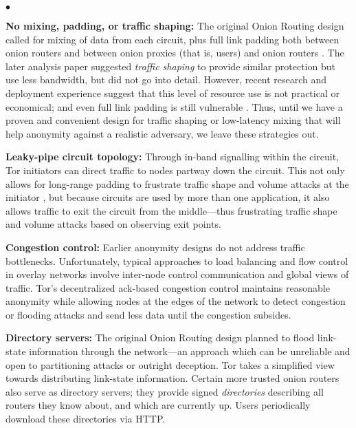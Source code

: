 \documentclass[times,10pt,twocolumn]{article}
\newenvironment{tightlist}{\begin{list}{$\bullet$}{
  \setlength{\itemsep}{0mm}
    \setlength{\parsep}{0mm}
    }}{\end{list}}
\begin{document}
\begin{tightlist}
\item \textbf{No mixing, padding, or traffic shaping:} The original
Onion Routing design called for mixing of data from each circuit,
plus full link padding both between onion routers and between onion
proxies (that is, users) and onion routers \cite{or-jsac98}. The
later analysis paper \cite{or-pet00} suggested \emph{traffic shaping}
to provide similar protection but use less bandwidth, but did not go
into detail. However, recent research \cite{econymics} and deployment
experience \cite{freedom21-security} suggest that this level of resource
use is not practical or economical; and even full link padding is still
vulnerable \cite{defensive-dropping}. Thus, until we have a proven and
convenient design for traffic shaping or low-latency mixing that will help
anonymity against a realistic adversary, we leave these strategies out.

\item \textbf{Leaky-pipe circuit topology:} Through in-band
  signalling within the
  circuit, Tor initiators can direct traffic to nodes partway down the
  circuit. This not only allows for long-range padding to frustrate traffic
  shape and volume attacks at the initiator \cite{defensive-dropping},
  but because circuits are used by more than one application, it also
  allows traffic to exit the circuit from the middle---thus
  frustrating traffic shape and volume attacks based on observing exit
  points.

\item \textbf{Congestion control:} Earlier anonymity designs do not
address traffic bottlenecks. Unfortunately, typical approaches to load
balancing and flow control in overlay networks involve inter-node control
communication and global views of traffic. Tor's decentralized ack-based
congestion control maintains reasonable anonymity while allowing nodes
at the edges of the network to detect congestion or flooding attacks
and send less data until the congestion subsides.

\item \textbf{Directory servers:} The original Onion Routing design
planned to flood link-state information through the network---an
approach which can be unreliable and
open to partitioning attacks or outright deception. Tor takes a simplified
view towards distributing link-state information. Certain more trusted
onion routers also serve as directory servers; they provide signed
\emph{directories} describing all routers they know about, and which
are currently up. Users periodically download these directories via HTTP.


\end{tightlist}
\end{document}
